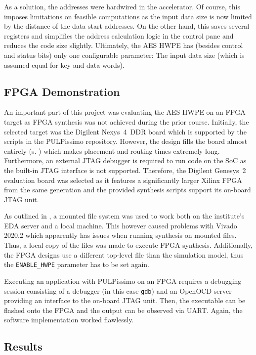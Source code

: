 \documentclass[a4paper, 12pt]{article}
\begin{document}
As a solution, the addresses were hardwired in the accelerator. Of course, this imposes limitations on feasible computations as the input data size is now limited by the distance of the data start addresses. On the other hand, this saves several registers and simplifies the address calculation logic in the control pane and reduces the code size slightly. Ultimately, the AES HWPE has (besides control and status bits) only one configurable parameter: The input data size (which is assumed equal for key and data words).

\subsection{FPGA Demonstration}

An important part of this project was evaluating the AES HWPE on an FPGA target as FPGA synthesis was not achieved during the prior course. Initially, the selected target was the Digilent Nexys~4~DDR board which is supported by the scripts in the PULPissimo repository. However, the design fills the board almost entirely (s. ) which makes placement and routing times extremely long. Furthermore, an external JTAG debugger is required to run code on the SoC as the built-in JTAG interface is not supported. Therefore, the Digilent Genesys~2 evaluation board was selected as it features a significantly larger Xilinx FPGA from the same generation and the provided synthesis scripts support its on-board JTAG unit.

As outlined in , a mounted file system was used to work both on the institute's EDA server and a local machine. This however caused problems with Vivado 2020.2 which apparently has issues when running synthesis on mounted files. Thus, a local copy of the files was made to execute FPGA synthesis. Additionally, the FPGA designs use a different top-level file than the simulation model, thus the \verb|ENABLE_HWPE| parameter has to be set again.

Executing an application with PULPissimo on an FPGA requires a debugging session consisting of a debugger (in this case \texttt{gdb}) and an OpenOCD server providing an interface to the on-board JTAG unit. Then, the executable can be flashed onto the FPGA and the output can be observed via UART. Again, the software implementation worked flawlessly. 

\subsection{Results} \label{sec:improvements:results}
\end{document}
